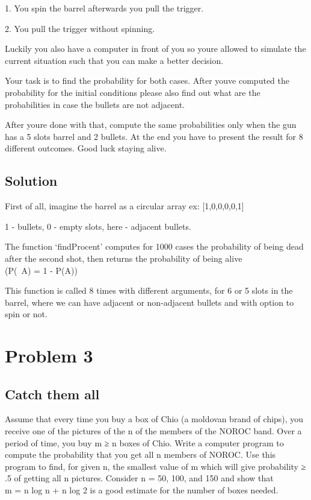 \documentclass{article}
\begin{document}
    1. You spin the barrel afterwards you pull the trigger.

    2. You pull the trigger without spinning.

    Luckily you also have a computer in front of you so you\textquotesingle re
    allowed to simulate the current situation such that you can make a better
    decision.

    Your task is to find the probability for both cases. After
    you\textquotesingle ve computed the probability for the initial conditions
    please also find out what are the probabilities in case the bullets
    are not adjacent.

    After you\textquotesingle re done with that, compute the same probabilities
    only when the gun has a 5 slots barrel and 2 bullets. At the end you have
    to present the result for 8 different outcomes. Good luck staying alive.

    \subsection{Solution}

    \hspace{5mm} First of all, imagine the barrel as a circular array ex:
    [1,0,0,0,0,1]

    1 - bullets, 0 - empty slots, here - adjacent bullets.

    The function `findProcent' computes for 1000 cases the probability of being
    dead after the second shot, then returns the probability of being alive\\
    (P(~A) = 1 - P(A))

    This function is called 8 times with different arguments, for 6 or 5 slots
    in the barrel, where we can have adjacent or non-adjacent bullets and with
    option to spin or not.

  \newpage

  \section{Problem 3}

    \subsection{Catch them all}

    \hspace{5mm}Assume that every time you buy a box of Chio (a moldovan brand
    of chips), you receive one of the pictures of the n of the members of
    the NOROC band. Over a period of time, you buy m ≥ n boxes of Chio.
    Write a computer program to compute the probability that you get all
    n members of NOROC. Use this program to find, for given n, the smallest
    value of m which will give probability ≥ .5 of getting all n pictures.
    Consider n = 50, 100, and 150 and show that\\ m = n log n + n log 2
    is a good estimate for the number of boxes needed.
\end{document}
